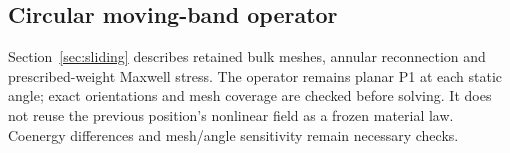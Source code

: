 \subsection{Circular moving-band operator}
Section~\ref{sec:sliding} describes retained bulk meshes, annular reconnection
and prescribed-weight Maxwell stress. The operator remains planar P1 at each
static angle; exact orientations and mesh coverage are checked before solving.
It does not reuse the previous position's nonlinear field as a frozen material
law. Coenergy differences and mesh/angle sensitivity remain necessary checks.
